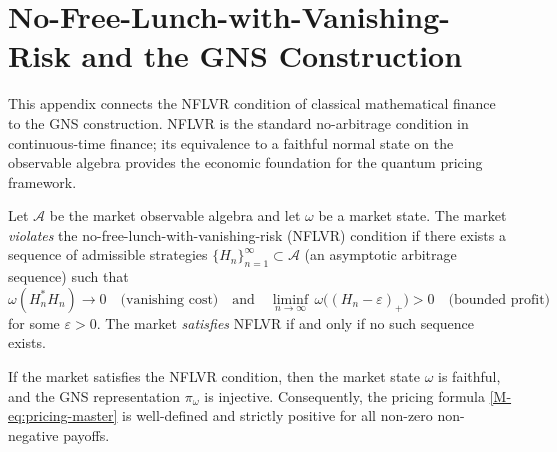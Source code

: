 
\section{No-Free-Lunch-with-Vanishing-Risk and the GNS Construction}
\label{app:nflvr}

This appendix connects the NFLVR condition of classical mathematical finance
\citep{delbaen1994general} to the GNS construction. NFLVR is the standard
no-arbitrage condition in continuous-time finance; its equivalence to a faithful
normal state on the observable algebra provides the economic foundation for the
quantum pricing framework.

\begin{definition}\label{def:nflvr}
Let $\mathcal{A}$ be the market observable algebra and let $\omega$ be a market
state. The market \emph{violates} the no-free-lunch-with-vanishing-risk (NFLVR)
condition if there exists a sequence of admissible strategies
$\{H_n\}_{n=1}^\infty \subset \mathcal{A}$ (an asymptotic arbitrage sequence)
such that
\begin{equation*}
    \omega(H_n^* H_n) \to 0
    \quad\text{(vanishing cost)}
    \quad\text{and}\quad
    \liminf_{n\to\infty}\,\omega\bigl((H_n - \varepsilon)_+\bigr) > 0
    \quad\text{(bounded profit)}
\end{equation*}
for some $\varepsilon > 0$. The market \emph{satisfies} NFLVR if and only if no
such sequence exists.
\end{definition}

\begin{theorem}\label{thm:nflvr-gns}
If the market satisfies the NFLVR condition, then the market state $\omega$ is
faithful, and the GNS representation $\pi_\omega$ is injective. Consequently, the
pricing formula \eqref{M-eq:pricing-master} is well-defined and strictly positive
for all non-zero non-negative payoffs.
\end{theorem}

